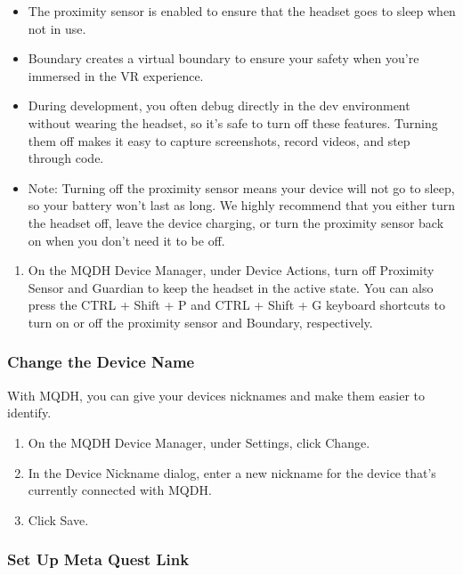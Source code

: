 \documentclass{article}
\begin{document}
\begin{itemize}
    \item The proximity sensor is enabled to ensure that the headset goes to sleep when not in use.
    \item Boundary creates a virtual boundary to ensure your safety when you’re immersed in the VR experience.
    \item During development, you often debug directly in the dev environment without wearing the headset, so it’s safe to turn off these features. Turning them off makes it easy to capture screenshots, record videos, and step through code.
    \item Note: Turning off the proximity sensor means your device will not go to sleep, so your battery won’t last as long. We highly recommend that you either turn the headset off, leave the device charging, or turn the proximity sensor back on when you don’t need it to be off.
\end{itemize}

\begin{enumerate}
    \item On the MQDH Device Manager, under Device Actions, turn off Proximity Sensor and Guardian to keep the headset in the active state. You can also press the CTRL + Shift + P and CTRL + Shift + G keyboard shortcuts to turn on or off the proximity sensor and Boundary, respectively.
\end{enumerate}

\subsubsection{Change the Device Name}

With MQDH, you can give your devices nicknames and make them easier to identify.

\begin{enumerate}
    \item On the MQDH Device Manager, under Settings, click Change.
    \item In the Device Nickname dialog, enter a new nickname for the device that’s currently connected with MQDH.
    \item Click Save.
\end{enumerate}

\subsubsection{Set Up Meta Quest Link}
\end{document}

